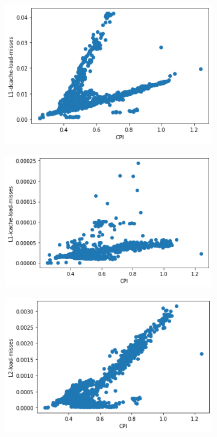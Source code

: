\documentclass[10pt, letterpaper, IEEEtran, tikz,border=5,a4paper,fleqn]{article}
\begin{document}
\begin{figure}
\begin{subfigure}{.33\textwidth}
  \centering
  \includegraphics[width=.9\linewidth]{l1-dcache-load.png}

\end{subfigure}%
\begin{subfigure}{.33\textwidth}
  \centering
  \includegraphics[width=.9\linewidth]{l1-icache-load.png}

\end{subfigure}%
\begin{subfigure}{.33\textwidth}
  \centering
  \includegraphics[width=.9\linewidth]{L2-load-misses.png}


\end{subfigure}
\end{figure}
\end{document}
